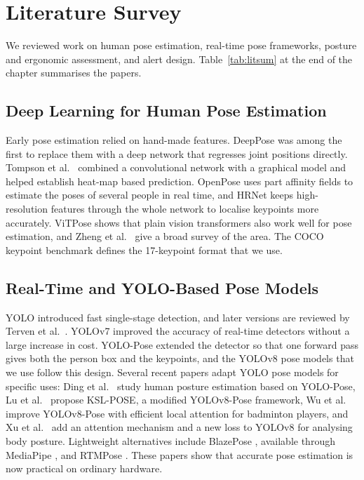﻿\documentclass[12pt,a4paper]{article}
\begin{document}
\clearpage
\section{Literature Survey}
We reviewed work on human pose estimation, real-time pose frameworks, posture and
ergonomic assessment, and alert design. Table~\ref{tab:litsum} at the end of the chapter
summarises the papers.

\subsection{Deep Learning for Human Pose Estimation}
Early pose estimation relied on hand-made features. DeepPose \cite{deeppose} was among the
first to replace them with a deep network that regresses joint positions directly.
Tompson et al.\ \cite{tompson2014joint} combined a convolutional network with a graphical
model and helped establish heat-map based prediction. OpenPose \cite{openpose} uses part
affinity fields to estimate the poses of several people in real time, and HRNet
\cite{hrnet} keeps high-resolution features through the whole network to localise
keypoints more accurately. ViTPose \cite{vitpose} shows that plain vision transformers also
work well for pose estimation, and Zheng et al.\ \cite{zheng2023survey} give a broad
survey of the area. The COCO keypoint benchmark \cite{cocodataset} defines the
17-keypoint format that we use.

\subsection{Real-Time and YOLO-Based Pose Models}
YOLO \cite{redmon2016you} introduced fast single-stage detection, and later versions are
reviewed by Terven et al.\ \cite{terven2023yolo}. YOLOv7 \cite{wang2023yolov7} improved the
accuracy of real-time detectors without a large increase in cost. YOLO-Pose
\cite{maji2022yolopose} extended the detector so that one forward pass gives both the
person box and the keypoints, and the YOLOv8 pose models \cite{ultralytics} that we use
follow this design. Several recent papers adapt YOLO pose models for specific uses: Ding et
al.\ \cite{ding2024yolopose} study human posture estimation based on YOLO-Pose, Lu et al.\
\cite{lu2024ksl} propose KSL-POSE, a modified YOLOv8-Pose framework, Wu et al.\
\cite{wu2025badminton} improve YOLOv8-Pose with efficient local attention for badminton
players, and Xu et al.\ \cite{xu2025simdlka} add an attention mechanism and a new loss to
YOLOv8 for analysing body posture. Lightweight alternatives include BlazePose
\cite{blazepose}, available through MediaPipe \cite{lugaresi2019mediapipe}, and RTMPose
\cite{jiang2023rtmpose}. These papers show that accurate pose estimation is now practical
on ordinary hardware.
\end{document}
